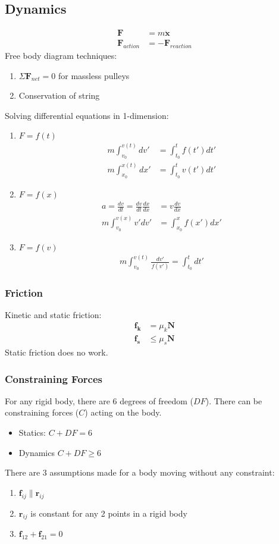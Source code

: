 \documentclass[a4paper]{article}
\newcommand{\ve}[1]{
  \ensuremath{\bm{#1}}}	               %
\begin{document}
\begin{multicols*}{2}
\subsection{Dynamics}
\begin{align*}
  \ve{F} &= m \ve{\ddot{x}} \\
  \ve{F}_{action} &= - \ve{F}_{reaction}
\end{align*}
Free body diagram techniques:
\begin{enumerate}
\item $\Sigma \ve{F}_{net} = 0$ for massless pulleys
\item Conservation of string
\end{enumerate}
Solving differential equations in 1-dimension:
\begin{enumerate}
\item $F=f(t)$
  \begin{align*}
    m \int_{v_0}^{v(t)} dv' &= \int_{t_0}^{t} f(t') dt' \\
    m \int_{x_0}^{x(t)} dx' &= \int_{t_0}^{t} v(t') dt'
  \end{align*}
\item $F=f(x)$
  \begin{align*}
    a= \frac{dv}{dt} = \frac{dv}{dt} \frac{dx}{dx} &= v \frac{dv}{dx} \\
    m \int_{v_0}^{v(x)} v' dv' &= \int_{x_0}^{x} f(x') dx'
  \end{align*}
\item $F=f(v)$
  \begin{align*}
    m \int_{v_0}^{v(t)} \frac{dv'}{f(v')} = \int_{t_0}^{t}dt'
  \end{align*}
\end{enumerate}
\subsubsection{Friction}
Kinetic and static friction:
\begin{align*}
  \ve{f_k}&=\mu_k\ve{N} \\
  \ve{f_s}&\leq\mu_s\ve{N}
\end{align*}
Static friction does no work.
\subsubsection{Constraining Forces}
For any rigid body, there are 6 degrees of freedom ($DF$). There can be
constraining forces ($C$) acting on the body.
\begin{itemize}
\item Statics: $C+DF=6$
\item Dynamics $C+DF \geq 6$
\end{itemize}
There are 3 assumptions made for a body moving without any constraint:
\begin{enumerate}
\item $\ve{f}_{ij} \parallel \ve{r}_{ij}$
\item $\ve{r}_{ij}$ is constant for any 2 points in a rigid body
\item $\ve{f}_{12} + \ve{f}_{21} = 0$
\end{enumerate}

\end{multicols*}
\end{document}
